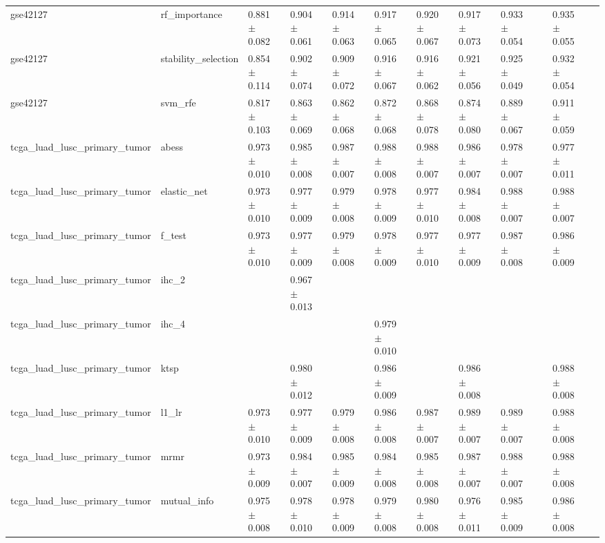 \begin{table}[t]
\begin{tabular}{llllllllllll}
    gse42127 & rf\_importance & 0.881 $\pm$ 0.082 & 0.904 $\pm$ 0.061 & 0.914 $\pm$ 0.063 & 0.917 $\pm$ 0.065 & 0.920 $\pm$ 0.067 & 0.917 $\pm$ 0.073 & 0.933 $\pm$ 0.054 &  & 0.935 $\pm$ 0.055 &  \\
    gse42127 & stability\_selection & 0.854 $\pm$ 0.114 & 0.902 $\pm$ 0.074 & 0.909 $\pm$ 0.072 & 0.916 $\pm$ 0.067 & 0.916 $\pm$ 0.062 & 0.921 $\pm$ 0.056 & 0.925 $\pm$ 0.049 &  & 0.932 $\pm$ 0.054 &  \\
    gse42127 & svm\_rfe & 0.817 $\pm$ 0.103 & 0.863 $\pm$ 0.069 & 0.862 $\pm$ 0.068 & 0.872 $\pm$ 0.068 & 0.868 $\pm$ 0.078 & 0.874 $\pm$ 0.080 & 0.889 $\pm$ 0.067 &  & 0.911 $\pm$ 0.059 &  \\
    tcga\_luad\_lusc\_primary\_tumor & abess & 0.973 $\pm$ 0.010 & 0.985 $\pm$ 0.008 & 0.987 $\pm$ 0.007 & 0.988 $\pm$ 0.008 & 0.988 $\pm$ 0.007 & 0.986 $\pm$ 0.007 & 0.978 $\pm$ 0.007 &  & 0.977 $\pm$ 0.011 &  \\
    tcga\_luad\_lusc\_primary\_tumor & elastic\_net & 0.973 $\pm$ 0.010 & 0.977 $\pm$ 0.009 & 0.979 $\pm$ 0.008 & 0.978 $\pm$ 0.009 & 0.977 $\pm$ 0.010 & 0.984 $\pm$ 0.008 & 0.988 $\pm$ 0.007 &  & 0.988 $\pm$ 0.007 &  \\
    tcga\_luad\_lusc\_primary\_tumor & f\_test & 0.973 $\pm$ 0.010 & 0.977 $\pm$ 0.009 & 0.979 $\pm$ 0.008 & 0.978 $\pm$ 0.009 & 0.977 $\pm$ 0.010 & 0.977 $\pm$ 0.009 & 0.987 $\pm$ 0.008 &  & 0.986 $\pm$ 0.009 &  \\
    tcga\_luad\_lusc\_primary\_tumor & ihc\_2 &  & 0.967 $\pm$ 0.013 &  &  &  &  &  &  &  &  \\
    tcga\_luad\_lusc\_primary\_tumor & ihc\_4 &  &  &  & 0.979 $\pm$ 0.010 &  &  &  &  &  &  \\
    tcga\_luad\_lusc\_primary\_tumor & ktsp &  & 0.980 $\pm$ 0.012 &  & 0.986 $\pm$ 0.009 &  & 0.986 $\pm$ 0.008 &  &  & 0.988 $\pm$ 0.008 &  \\
    tcga\_luad\_lusc\_primary\_tumor & l1\_lr & 0.973 $\pm$ 0.010 & 0.977 $\pm$ 0.009 & 0.979 $\pm$ 0.008 & 0.986 $\pm$ 0.008 & 0.987 $\pm$ 0.007 & 0.989 $\pm$ 0.007 & 0.989 $\pm$ 0.007 &  & 0.988 $\pm$ 0.008 &  \\
    tcga\_luad\_lusc\_primary\_tumor & mrmr & 0.973 $\pm$ 0.009 & 0.984 $\pm$ 0.007 & 0.985 $\pm$ 0.009 & 0.984 $\pm$ 0.008 & 0.985 $\pm$ 0.008 & 0.987 $\pm$ 0.007 & 0.988 $\pm$ 0.007 &  & 0.988 $\pm$ 0.008 &  \\
    tcga\_luad\_lusc\_primary\_tumor & mutual\_info & 0.975 $\pm$ 0.008 & 0.978 $\pm$ 0.010 & 0.978 $\pm$ 0.009 & 0.979 $\pm$ 0.008 & 0.980 $\pm$ 0.008 & 0.976 $\pm$ 0.011 & 0.985 $\pm$ 0.009 &  & 0.986 $\pm$ 0.008 &  \\

\end{tabular}
\end{table}
